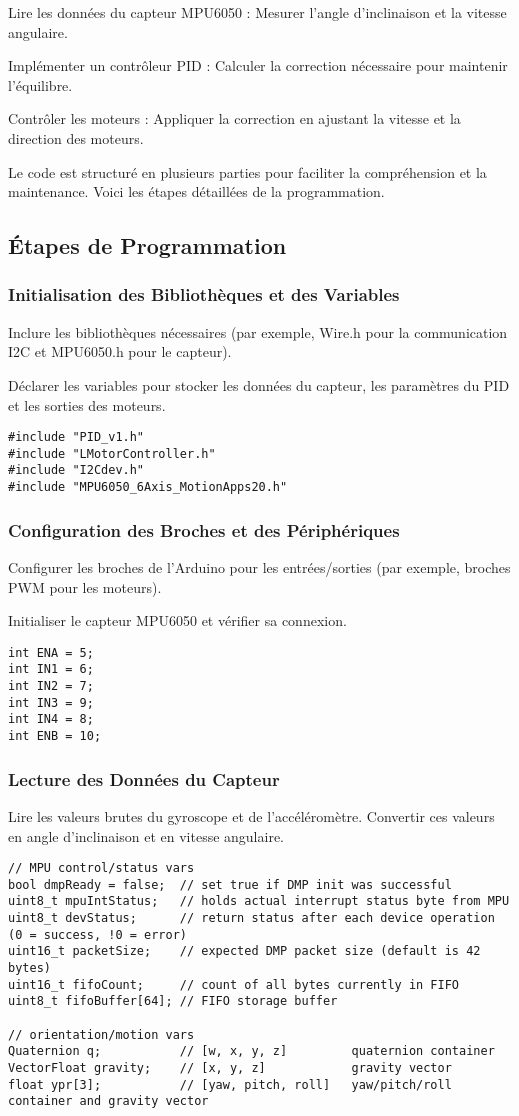\documentclass{report}
\begin{document}
Lire les données du capteur MPU6050 : Mesurer l'angle d'inclinaison et la vitesse angulaire.

Implémenter un contrôleur PID : Calculer la correction nécessaire pour maintenir l'équilibre.

Contrôler les moteurs : Appliquer la correction en ajustant la vitesse et la direction des moteurs.

Le code est structuré en plusieurs parties pour faciliter la compréhension et la maintenance. Voici les étapes détaillées de la programmation.
\subsection{Étapes de Programmation}
\subsubsection{Initialisation des Bibliothèques et des Variables}
Inclure les bibliothèques nécessaires (par exemple, Wire.h pour la communication I2C et MPU6050.h pour le capteur).

Déclarer les variables pour stocker les données du capteur, les paramètres du PID et les sorties des moteurs.
\begin{verbatim}
#include "PID_v1.h"
#include "LMotorController.h"
#include "I2Cdev.h"
#include "MPU6050_6Axis_MotionApps20.h"
\end{verbatim}
\subsubsection{Configuration des Broches et des Périphériques}
Configurer les broches de l'Arduino pour les entrées/sorties (par exemple, broches PWM pour les moteurs).

Initialiser le capteur MPU6050 et vérifier sa connexion.
\begin{verbatim}
int ENA = 5;
int IN1 = 6;
int IN2 = 7;
int IN3 = 9;
int IN4 = 8;
int ENB = 10;
\end{verbatim}
\subsubsection{Lecture des Données du Capteur}
Lire les valeurs brutes du gyroscope et de l'accéléromètre.
Convertir ces valeurs en angle d'inclinaison et en vitesse angulaire.
\begin{verbatim}
// MPU control/status vars
bool dmpReady = false;  // set true if DMP init was successful
uint8_t mpuIntStatus;   // holds actual interrupt status byte from MPU
uint8_t devStatus;      // return status after each device operation (0 = success, !0 = error)
uint16_t packetSize;    // expected DMP packet size (default is 42 bytes)
uint16_t fifoCount;     // count of all bytes currently in FIFO
uint8_t fifoBuffer[64]; // FIFO storage buffer

// orientation/motion vars
Quaternion q;           // [w, x, y, z]         quaternion container
VectorFloat gravity;    // [x, y, z]            gravity vector
float ypr[3];           // [yaw, pitch, roll]   yaw/pitch/roll container and gravity vector
\end{verbatim}
\end{document}
